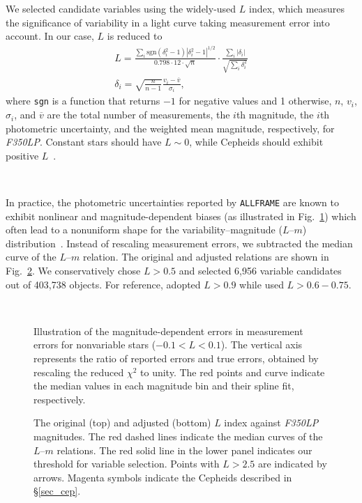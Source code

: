 \documentclass[twocolumn]{aastex63}
\newcommand{\hstw}{{\it F350LP} }
\newcommand{\hstws}{{\it F350LP}}
\begin{document}
We selected candidate variables using the widely-used \citet{Stetson1996} $L$ index, which measures the significance of variability in a light curve taking measurement error into account. In our case, $L$ is reduced to
\begin{gather*}
    L = \frac{\sum\limits_i \mathrm{sgn}(\delta_i^2-1){|\delta_i^2-1|}^{1/2}}{0.798\cdot 12 \cdot \sqrt{n}} \cdot \frac{\sum\limits_i|\delta_i|}{\sqrt{\sum\limits_i\delta_i^2}}\\
    \delta_i = \sqrt{\frac{n}{n-1}}\frac{v_i-\overline{v}}{\sigma_i},
\end{gather*}
where {\tt sgn} is a function that returns $-1$ for negative values and 1 otherwise, $n$, $v_i$, $\sigma_i$, and $\overline{v}$ are the total number of measurements, the $i$th magnitude, the $i$th photometric uncertainty, and the weighted mean magnitude, respectively, for \hstws. Constant stars should have $L\sim 0$, while Cepheids should exhibit positive $L$~\citep{Stetson1996}.

\ \par

In practice, the photometric uncertainties reported by {\tt ALLFRAME} are known to exhibit nonlinear and magnitude-dependent biases (as illustrated in Fig.~\ref{fig_er}) which often lead to a nonuniform shape for the variability--magnitude ($L$--$m$) distribution~\citep{1998AJ....115.1016K}. Instead of rescaling measurement errors, we subtracted the median curve of the $L$--$m$ relation. The original and adjusted relations are shown in Fig.~\ref{fig_l2}. We conservatively chose $L>0.5$ and selected 6,956 variable candidates out of 403,738 objects. For reference, \citet{Stetson1996} adopted $L>0.9$ while \citet{Hoffmann2016} used $L>0.6-0.75$.

\ \par

\begin{figure}
\caption{Illustration of the magnitude-dependent errors in measurement errors for nonvariable stars ($-0.1<L<0.1$). The vertical axis represents the ratio of reported errors and true errors, obtained by rescaling the reduced $\chi^2$ to unity. The red points and curve indicate the median values in each magnitude bin and their spline fit, respectively.\label{fig_er}}
\end{figure}

\begin{figure}
\caption{The original (top) and adjusted (bottom) $L$ index against \hstw magnitudes. The red dashed lines indicate the median curves of the $L$--$m$ relations. The red solid line in the lower panel indicates our threshold for variable selection. Points with $L>2.5$ are indicated by arrows. Magenta symbols indicate the Cepheids described in \S\ref{sec_cep}. \label{fig_l2}}
\end{figure}
\end{document}
